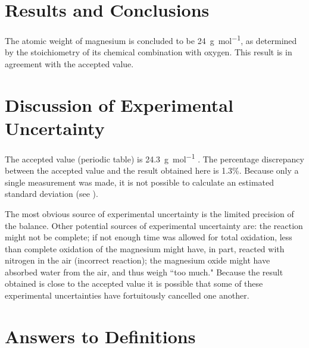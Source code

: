 \documentclass[
	a4paper, %
	12pt, %
]{CSUniSchoolLabReport}
\begin{document}

\section{Results and Conclusions}

The atomic weight of magnesium is concluded to be \SI{24}{\gram\per\mol}, as determined by the stoichiometry of its chemical combination with oxygen. This result is in agreement with the accepted value.



\section{Discussion of Experimental Uncertainty}

The accepted value (periodic table) is \SI{24.3}{\gram\per\mole} \autocite{Smith:2022qr}. The percentage discrepancy between the accepted value and the result obtained here is 1.3\%. Because only a single measurement was made, it is not possible to calculate an estimated standard deviation (see \textcite{Smith:2021jd}).

The most obvious source of experimental uncertainty is the limited precision of the balance. Other potential sources of experimental uncertainty are: the reaction might not be complete; if not enough time was allowed for total oxidation, less than complete oxidation of the magnesium might have, in part, reacted with nitrogen in the air (incorrect reaction); the magnesium oxide might have absorbed water from the air, and thus weigh ``too much." Because the result obtained is close to the accepted value it is possible that some of these experimental uncertainties have fortuitously cancelled one another.


\section{Answers to Definitions}
\end{document}
